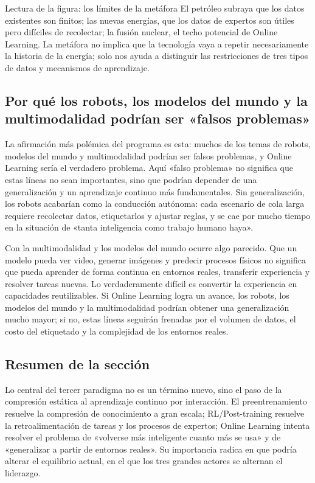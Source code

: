 \begin{knowledgebox}{Lectura de la figura: los límites de la metáfora}
El petróleo subraya que los datos existentes son finitos; las nuevas energías, que los datos de expertos son útiles pero difíciles de recolectar; la fusión nuclear, el techo potencial de Online Learning. La metáfora no implica que la tecnología vaya a repetir necesariamente la historia de la energía; solo nos ayuda a distinguir las restricciones de tres tipos de datos y mecanismos de aprendizaje.
\end{knowledgebox}

\subsection{Por qué los robots, los modelos del mundo y la multimodalidad podrían ser «falsos problemas»}

La afirmación más polémica del programa es esta: muchos de los temas de robots, modelos del mundo y multimodalidad podrían ser falsos problemas, y Online Learning sería el verdadero problema. Aquí «falso problema» no significa que estas líneas no sean importantes, sino que podrían depender de una generalización y un aprendizaje continuo más fundamentales. Sin generalización, los robots acabarían como la conducción autónoma: cada escenario de cola larga requiere recolectar datos, etiquetarlos y ajustar reglas, y se cae por mucho tiempo en la situación de «tanta inteligencia como trabajo humano haya».

Con la multimodalidad y los modelos del mundo ocurre algo parecido. Que un modelo pueda ver video, generar imágenes y predecir procesos físicos no significa que pueda aprender de forma continua en entornos reales, transferir experiencia y resolver tareas nuevas. Lo verdaderamente difícil es convertir la experiencia en capacidades reutilizables. Si Online Learning logra un avance, los robots, los modelos del mundo y la multimodalidad podrían obtener una generalización mucho mayor; si no, estas líneas seguirán frenadas por el volumen de datos, el costo del etiquetado y la complejidad de los entornos reales.

\subsection{Resumen de la sección}

Lo central del tercer paradigma no es un término nuevo, sino el paso de la compresión estática al aprendizaje continuo por interacción. El preentrenamiento resuelve la compresión de conocimiento a gran escala; RL/Post-training resuelve la retroalimentación de tareas y los procesos de expertos; Online Learning intenta resolver el problema de «volverse más inteligente cuanto más se usa» y de «generalizar a partir de entornos reales». Su importancia radica en que podría alterar el equilibrio actual, en el que los tres grandes actores se alternan el liderazgo.
